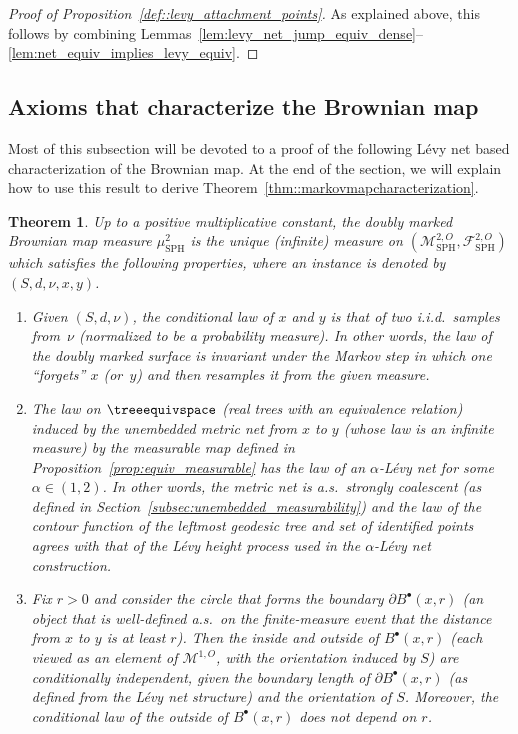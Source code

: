\documentclass[10pt]{amsart}
\let\mathcal\mathscr
\newcommand{\sbullet}{{\scriptscriptstyle\bullet}}
\theoremstyle{plain}
\newtheorem{theorem}{Theorem}
\numberwithin{theorem}{section}
\theoremstyle{definition}
\newcommand\gmsspace{{\mathcal M}_{\mathrm{SPH}}}
\newcommand\mmspace{{\mathcal M}}
\newcommand{\mmsigmaspho}{{\mathcal F}_{\mathrm{SPH}}^{2,O}}
\newcommand{\mustwo}{\mu_{\mathrm{SPH}}^2}
\newcommand{\fb}[2]{B^\sbullet(#1,#2)}
\begin{document}
\begin{proof}[Proof of Proposition~\ref{def::levy_attachment_points}]
As explained above, this follows by combining Lemmas~\ref{lem:levy_net_jump_equiv_dense}--\ref{lem:net_equiv_implies_levy_equiv}.
\end{proof}

\subsection{Axioms that characterize the Brownian map}
\label{subsec::axiomsforbrownianmap}

Most of this subsection will be devoted to a proof of the following Lévy net based characterization of the Brownian map. At the end of the section, we will explain how to use this result to derive Theorem~\ref{thm::markovmapcharacterization}.

\begin{theorem}
\label{thm::levynetbasedcharacterization}
Up to a positive multiplicative constant, the doubly marked Brownian map measure $\mustwo$ is the unique (infinite) measure on $(\gmsspace^{2,O}, \mmsigmaspho)$ which satisfies the following properties, where an instance is denoted by $(S,d,\nu,x,y)$.
\begin{enumerate}
\item Given $(S,d,\nu)$, the conditional law of $x$ and $y$ is that of two i.i.d.\ samples from~$\nu$ (normalized to be a probability measure). In other words, the law of the doubly marked surface is invariant under the Markov step in which one ``forgets'' $x$ (or~$y$) and then resamples it from the given measure.
\item The law on $\treeequivspace$ (real trees with an equivalence relation) induced by the unembedded metric net from $x$ to $y$ (whose law is an infinite measure) by the measurable map defined in Proposition~\ref{prop:equiv_measurable} has the law of an $\alpha$-Lévy net for some $\alpha \in (1,2)$. In other words, the metric net is a.s.\ strongly coalescent (as defined in Section~\ref{subsec:unembedded_measurability}) and the law of the contour function of the leftmost geodesic tree and set of identified points agrees with that of the Lévy height process used in the $\alpha$-Lévy net construction.

\item Fix $r>0$ and consider the circle that forms the boundary $\partial \fb{x}{r}$ (an object that is well-defined a.s.\ on the finite-measure event that the distance from $x$ to $y$ is at least $r$). Then the inside and outside of $\fb{x}{r}$ (each viewed as an element of $\mmspace^{1,O}$, with the orientation induced by $S$) are conditionally independent, given the boundary length of $\partial \fb{x}{r}$ (as defined from the Lévy net structure) and the orientation of $S$. Moreover, the conditional law of the outside of $\fb{x}{r}$ does not depend on $r$.
\end{enumerate}
\end{theorem}
\end{document}
